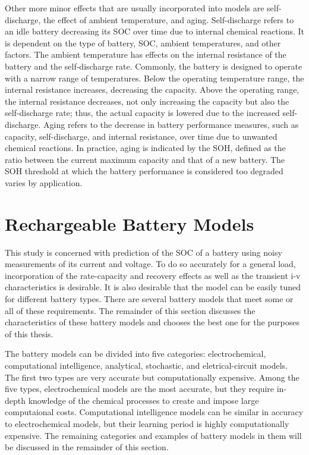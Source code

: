 Other more minor effects that are usually incorporated into models are self-discharge, the effect of ambient temperature, and aging. Self-discharge refers to an idle battery decreasing its SOC over time due to internal chemical reactions. It is dependent on the type of battery, SOC, ambient temperatures, and other factors. The ambient temperature has effects on the internal resistance of the battery and the self-discharge rate. Commonly, the battery is designed to operate with a narrow range of temperatures. Below the operating temperature range, the internal resistance increases, decreasing the capacity. Above the operating range, the internal resistance decreases, not only increasing the capacity but also the self-discharge rate; thus, the actual capacity is lowered due to the increased self-discharge. Aging refers to the decrease in battery performance measures, such as capacity, self-discharge, and internal resistance, over time due to unwanted chemical reactions. In practice, aging is indicated by the SOH, defined as the ratio between the current maximum capacity and that of a new battery. The SOH threshold at which the battery performance is considered too degraded varies by application.


\section{Rechargeable Battery Models}

This study is concerned with prediction of the SOC of a battery using noisy measurements of its current and voltage. To do so accurately for a general load, incorporation of the rate-capacity and recovery effects as well as the transient i-v characteristics is desirable. It is also desirable that the model can be easily tuned for different battery types. There are several battery models that meet some or all of these requirements. The remainder of this section discusses the
characteristics of these battery models and chooses the best one for the purposes of this thesis.

The battery models can be divided into five categories: electrochemical, computational intelligence, analytical, stochastic, and eletrical-circuit models. The first two types are very accurate but computationally expensive. Among the five types, electrochemical models are the most accurate, but they require in-depth knowledge of the chemical processes to create and impose large computaional costs\cite{jongerden09}. Computational intelligence models can be similar in accuracy to
electrochemical models, but their learning period is highly computationally expensive\cite{capizzi11,shen02}. The remaining categories and examples of battery models in them will be discussed in the remainder of this section.

